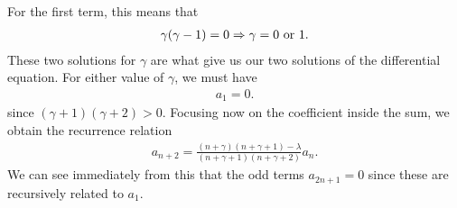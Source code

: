 For the first term, this means that
\begin{eqnarray}
    \gamma(\gamma - 1) = 0 \Rightarrow \gamma = 0~{\rm or}~1
.\end{eqnarray}
These two solutions for $\gamma$ are what give us our two solutions of the differential equation.
For either value of $\gamma$, we must have
\begin{eqnarray}
    a_1 = 0
.\end{eqnarray}
since $(\gamma + 1)(\gamma+2) > 0$.
Focusing now on the coefficient inside the sum, we obtain the recurrence relation
\begin{align}
    \label{eq:legendre-rec-rel}
    a_{n+2} = \frac{(n+\gamma)(n+\gamma+1) - \lambda}{(n+\gamma+1)(n+\gamma+2)} a_{n}
.\end{align}
We can see immediately from this that the odd terms $a_{2n+1} = 0$ since these are recursively related to $a_1$.

